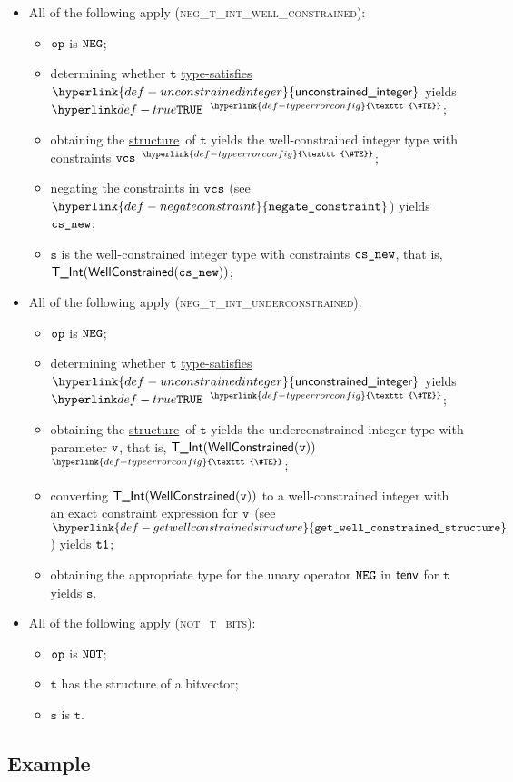 \documentclass{book}
\newcommand\TypeErrorConfig[0]{\hyperlink{def-typeerrorconfig}{\texttt{\#TE}}}
\newcommand\ProseOrTypeError[0]{\hyperlink{def-proseortypeerror}{$^{\TypeErrorConfig}$}}
\newcommand\unconstrainedinteger[0]{\hyperlink{def-unconstrainedinteger}{\textsf{unconstrained\_integer}}}
\newcommand\negateconstraint[0]{\hyperlink{def-negateconstraint}{\texttt{negate\_constraint}}}
\newcommand\getwellconstrainedstructure[0]{\hyperlink{def-getwellconstrainedstructure}{\texttt{get\_well\_constrained\_structure}}}
\newcommand\structure[0]{\hyperlink{def-structure}{structure}}
\newcommand\typesatisfies[0]{\hyperlink{def-typesatisfies}{type-satisfies}}
\newcommand\vt[0]{\texttt{t}}
\newcommand\vs[0]{\texttt{s}}
\begin{document}
\begin{itemize}
\item All of the following apply (\textsc{neg\_t\_int\_well\_constrained}):
\begin{itemize}
  \item $\texttt{op}$ is $\texttt{NEG}$;
  \item determining whether $\vt$ \typesatisfies\ $\unconstrainedinteger$ yields $\True$ \ProseOrTypeError;
  \item obtaining the \structure\ of $\vt$ yields the well-constrained integer type with constraints $\texttt{vcs}$ \ProseOrTypeError;
  \item negating the constraints in $\texttt{vcs}$ (see $\negateconstraint$) yields $\texttt{cs\_new}$;
  \item $\vs$ is the well-constrained integer type with constraints $\texttt{cs\_new}$, that is, \\
  $\textsf{T\_Int}(\textsf{WellConstrained}(\texttt{cs\_new}))$;
\end{itemize}

\item All of the following apply (\textsc{neg\_t\_int\_underconstrained}):
\begin{itemize}
  \item $\texttt{op}$ is $\texttt{NEG}$;
  \item determining whether $\vt$ \typesatisfies\ $\unconstrainedinteger$ yields $\True$ \ProseOrTypeError;
  \item obtaining the \structure\ of $\vt$ yields the underconstrained integer type with parameter $\texttt{v}$, that is,
  $\textsf{T\_Int}(\textsf{WellConstrained}(\texttt{v}))$ \ProseOrTypeError;
  \item converting $\textsf{T\_Int}(\textsf{WellConstrained}(\texttt{v}))$ to a well-constrained integer with an exact constraint expression for $\texttt{v}$
  (see $\getwellconstrainedstructure$) yields $\texttt{t1}$;
  \item obtaining the appropriate type for the unary operator $\texttt{NEG}$ in $\textsf{tenv}$ for $\vt$ yields $\vs$.
\end{itemize}

\item All of the following apply (\textsc{not\_t\_bits}):
  \begin{itemize}
  \item $\texttt{op}$ is $\texttt{NOT}$;
  \item $\vt$ has the structure of a bitvector;
  \item $\vs$ is $\vt$.
  \end{itemize}
\end{itemize}

\subsection{Example}
\end{document}
